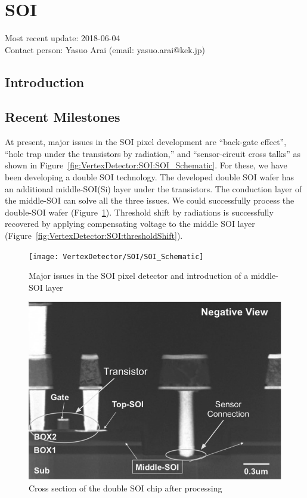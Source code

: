 \section{SOI}
Most recent update: 2018-06-04 \\
Contact person: Yasuo Arai (email: yasuo.arai@kek.jp)
\subsection{Introduction}
\subsection{Recent Milestones}
At present, major issues in the SOI pixel development are ``back-gate effect'', ``hole trap under the transistors by radiation,'' and ``sensor-circuit cross talks'' as shown in Figure~\ref{fig:VertexDetector:SOI:SOI_Schematic}. For these, we have been developing a double SOI technology. The developed double SOI wafer has an additional middle-SOI(Si) layer under the transistors. The conduction layer of the middle-SOI can solve all the three issues. We could successfully process the double-SOI wafer (Figure~\ref{fig:VertexDetector:SOI:crossSectionAfterProcessing}). Threshold shift by radiations is successfully recovered by applying compensating voltage to the middle SOI layer (Figure~\ref{fig:VertexDetector:SOI:thresholdShift}).

\begin{figure}
	\begin{minipage}{0.49\textwidth}
		\centering     
		\texttt{[image: VertexDetector/SOI/SOI\_Schematic]}
		\caption{Major issues in the SOI pixel detector and introduction of a middle-SOI layer}
		\label{fig:VertexDetector:SOI:SOI_Schematic}
 	\end{minipage}
 	\hfill
 	\begin{minipage}{0.49\textwidth}
 		\centering
    	\includegraphics*[width=\textwidth,keepaspectratio]{VertexDetector/SOI/crossSectionAfterProcessing}
		\caption{Cross section of the double SOI chip after processing}
		\label{fig:VertexDetector:SOI:crossSectionAfterProcessing}
 	\end{minipage}
 \end{figure}

